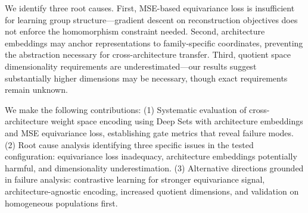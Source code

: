 We identify three root causes. First, MSE-based equivariance loss is insufficient for learning group structure—gradient descent on reconstruction objectives does not enforce the homomorphism constraint needed. Second, architecture embeddings may anchor representations to family-specific coordinates, preventing the abstraction necessary for cross-architecture transfer. Third, quotient space dimensionality requirements are underestimated—our results suggest substantially higher dimensions may be necessary, though exact requirements remain unknown.

We make the following contributions: (1) Systematic evaluation of cross-architecture weight space encoding using Deep Sets with architecture embeddings and MSE equivariance loss, establishing gate metrics that reveal failure modes. (2) Root cause analysis identifying three specific issues in the tested configuration: equivariance loss inadequacy, architecture embeddings potentially harmful, and dimensionality underestimation. (3) Alternative directions grounded in failure analysis: contrastive learning for stronger equivariance signal, architecture-agnostic encoding, increased quotient dimensions, and validation on homogeneous populations first.
